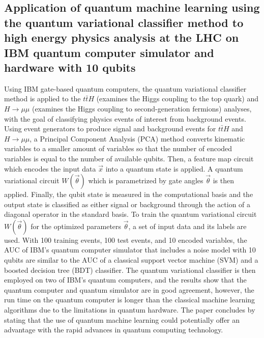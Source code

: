 \subsection{Application of quantum machine learning using the quantum variational classifier method to high energy physics analysis at the LHC on IBM quantum computer simulator and hardware with 10 qubits~\cite{Wu:2020cye}}
Using IBM gate-based quantum computers, the quantum variational classifier method is applied to the $t\bar{t}H$ (examines the Higgs coupling to the top quark) and $H\rightarrow\mu\mu$ (examines the Higgs coupling to second-generation fermions) analyses, with the goal of classifying physics events of interest from background events. Using event generators to produce signal and background events for $t\bar{t}H$ and $H\rightarrow\mu\mu$, a Principal Component Analysis (PCA) method converts kinematic variables to a smaller amount of variables so that the number of encoded variables is equal to the number of available qubits. Then, a feature map circuit which encodes the input data $\vec{x}$ into a quantum state is applied. A quantum variational circuit $W(\vec{\theta})$ which is parametrized by gate angles $\vec{\theta}$ is then applied. Finally, the qubit state is measured in the computational basis and the output state is classified as either signal or background through the action of a diagonal operator in the standard basis. To train the quantum variational circuit $W(\vec{\theta})$ for the optimized parameters $\vec{\theta}$, a set of input data and its labels are used. With 100 training events, 100 test events, and 10 encoded variables, the AUC of IBM's quantum computer simulator that includes a noise model with 10 qubits are similar to the AUC of a classical support vector machine (SVM) and a boosted decision tree (BDT) classifier. The quantum variational classifier is then employed on two of IBM's quantum computers, and the results show that the quantum computer and quantum simulator are in good agreement, however, the run time on the quantum computer is longer than the classical machine learning algorithms due to the limitations in quantum hardware. The paper concludes by stating that the use of quantum machine learning could potentially offer an advantage with the rapid advances in quantum computing technology.
